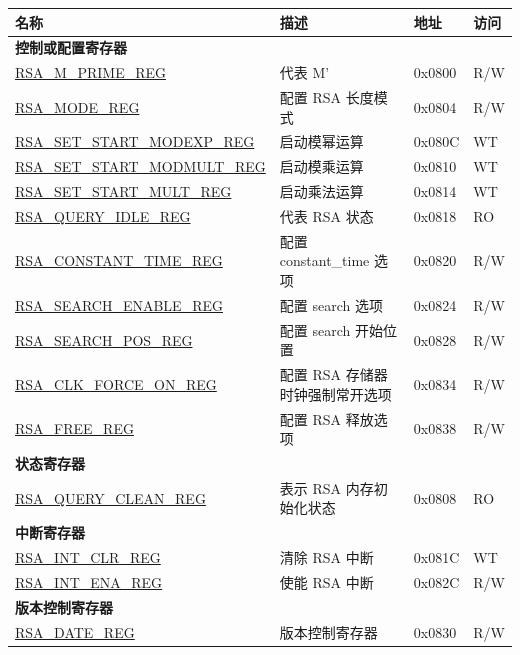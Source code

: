 \begin{longtable}{ | l | l | l | l | }
\hline\rowcolor{lightgray}
\textbf{名称} & \textbf{描述} &  \textbf{地址} & \textbf{访问} \\ \hline
\multicolumn{4}{|l|}{\textbf{控制或配置寄存器}} \\ \hline
\hyperref[regdesc:RSAMPRIMEREG]{RSA\_M\_PRIME\_REG} & 代表 M’ & 0x0800 & R/W \\ \hline
\hyperref[regdesc:RSAMODEREG]{RSA\_MODE\_REG} & 配置 RSA 长度模式 & 0x0804 & R/W \\ \hline
\hyperref[regdesc:RSASETSTARTMODEXPREG]{RSA\_SET\_START\_MODEXP\_REG} & 启动模幂运算 & 0x080C & WT \\ \hline
\hyperref[regdesc:RSASETSTARTMODMULTREG]{RSA\_SET\_START\_MODMULT\_REG} & 启动模乘运算 & 0x0810 & WT \\ \hline
\hyperref[regdesc:RSASETSTARTMULTREG]{RSA\_SET\_START\_MULT\_REG} & 启动乘法运算 & 0x0814 & WT \\ \hline
\hyperref[regdesc:RSAQUERYIDLEREG]{RSA\_QUERY\_IDLE\_REG} & 代表 RSA 状态 & 0x0818 & RO \\ \hline
\hyperref[regdesc:RSACONSTANTTIMEREG]{RSA\_CONSTANT\_TIME\_REG} & 配置 constant\_time 选项 & 0x0820 & R/W \\ \hline
\hyperref[regdesc:RSASEARCHENABLEREG]{RSA\_SEARCH\_ENABLE\_REG} & 配置 search 选项 & 0x0824 & R/W \\ \hline
\hyperref[regdesc:RSASEARCHPOSREG]{RSA\_SEARCH\_POS\_REG} & 配置 search 开始位置 & 0x0828 & R/W \\ \hline
\hyperref[regdesc:RSACLKFORCEONREG]{RSA\_CLK\_FORCE\_ON\_REG} & 配置 RSA 存储器时钟强制常开选项 & 0x0834 & R/W \\ \hline
\hyperref[regdesc:RSAFREEREG]{RSA\_FREE\_REG} & 配置 RSA 释放选项 & 0x0838 & R/W \\ \hline
\multicolumn{4}{|l|}{\textbf{状态寄存器}} \\ \hline
\hyperref[regdesc:RSAQUERYCLEANREG]{RSA\_QUERY\_CLEAN\_REG} & 表示 RSA 内存初始化状态  & 0x0808 & RO \\ \hline
\multicolumn{4}{|l|}{\textbf{中断寄存器}} \\ \hline
\hyperref[regdesc:RSAINTCLRREG]{RSA\_INT\_CLR\_REG} & 清除 RSA 中断 & 0x081C & WT \\ \hline
\hyperref[regdesc:RSAINTENAREG]{RSA\_INT\_ENA\_REG} & 使能 RSA 中断 & 0x082C & R/W \\ \hline
\multicolumn{4}{|l|}{\textbf{版本控制寄存器}} \\ \hline
\hyperref[regdesc:RSADATEREG]{RSA\_DATE\_REG} & 版本控制寄存器 & 0x0830 & R/W \\ \hline
\end{longtable}
